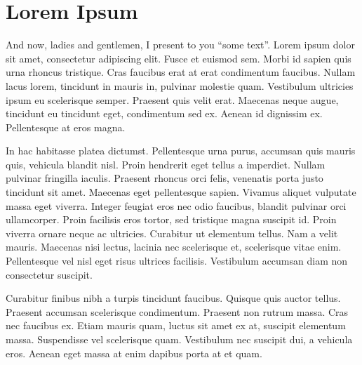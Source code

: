 \section{Lorem Ipsum}

And now, ladies and gentlemen, I present to you ``some text''. Lorem ipsum dolor sit amet, consectetur adipiscing elit. Fusce et euismod sem. Morbi id sapien quis urna rhoncus tristique. Cras faucibus erat at erat condimentum faucibus. Nullam lacus lorem, tincidunt in mauris in, pulvinar molestie quam. Vestibulum ultricies ipsum eu scelerisque semper. Praesent quis velit erat. Maecenas neque augue, tincidunt eu tincidunt eget, condimentum sed ex. Aenean id dignissim ex. Pellentesque at eros magna.

In hac habitasse platea dictumst. Pellentesque urna purus, accumsan quis mauris quis, vehicula blandit nisl. Proin hendrerit eget tellus a imperdiet. Nullam pulvinar fringilla iaculis. Praesent rhoncus orci felis, venenatis porta justo tincidunt sit amet. Maecenas eget pellentesque sapien. Vivamus aliquet vulputate massa eget viverra. Integer feugiat eros nec odio faucibus, blandit pulvinar orci ullamcorper. Proin facilisis eros tortor, sed tristique magna suscipit id. Proin viverra ornare neque ac ultricies. Curabitur ut elementum tellus. Nam a velit mauris. Maecenas nisi lectus, lacinia nec scelerisque et, scelerisque vitae enim. Pellentesque vel nisl eget risus ultrices facilisis. Vestibulum accumsan diam non consectetur suscipit.

Curabitur finibus nibh a turpis tincidunt faucibus. Quisque quis auctor tellus. Praesent accumsan scelerisque condimentum. Praesent non rutrum massa. Cras nec faucibus ex. Etiam mauris quam, luctus sit amet ex at, suscipit elementum massa. Suspendisse vel scelerisque quam. Vestibulum nec suscipit dui, a vehicula eros. Aenean eget massa at enim dapibus porta at et quam. 
